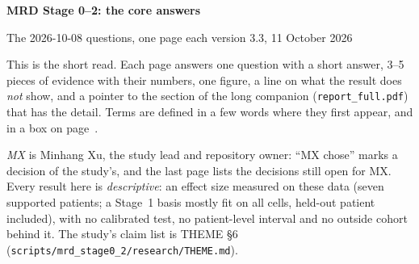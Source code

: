 \thispagestyle{plain}
\begin{flushleft}
{\LARGE\bfseries MRD Stage 0--2: the core answers\par}
\vspace{3pt}
{\large\color{inkmuted}The 2026-10-08 questions, one page each \textperiodcentered{} version 3.3, 11 October 2026\par}
\end{flushleft}
\vspace{-2pt}
{\small
This is the short read. Each page answers one question with a short answer, 3--5 pieces of evidence with their numbers, one figure, a line on what the result does \emph{not} show, and a pointer to the section of the long companion (\texttt{report\_full.pdf}) that has the detail. Terms are defined in a few words where they first appear, and in a box on page~\pageref{core:cohort}.

\emph{MX} is Minhang Xu, the study lead and repository owner: ``MX chose'' marks a decision of the study's, and the last page lists the decisions still open for MX. Every result here is \emph{descriptive}: an effect size measured on these data (seven supported patients; a Stage~1 basis mostly fit on all cells, held-out patient included), with no calibrated test, no patient-level interval and no outside cohort behind it. The study's claim list is THEME \S6 (\texttt{scripts/\allowbreak mrd\_stage0\_2/\allowbreak research/\allowbreak THEME.md}).\par}

